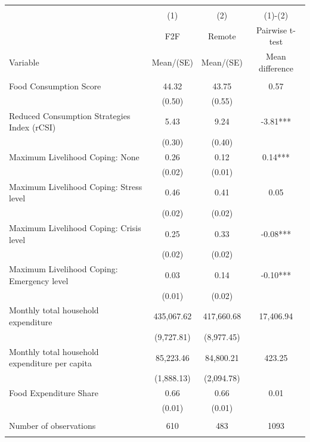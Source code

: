 
\begin{tabular}{@{\extracolsep{5pt}}lccc}
\\[-1.8ex]\hline \hline \\[-1.8ex]
 & \multicolumn{1}{c}{(1)}  & \multicolumn{1}{c}{(2)}  & \multicolumn{1}{c}{(1)-(2)} \\
 & \multicolumn{1}{c}{F2F}  & \multicolumn{1}{c}{Remote}  & \multicolumn{1}{c}{Pairwise t-test}  \\
Variable & Mean/(SE) & Mean/(SE) & Mean difference \\ \hline \\[-1.8ex] 
Food Consumption Score   & 44.32    & 43.75    & 0.57   \\
 & (0.50)  & (0.55)  &  \\ [1ex]
Reduced Consumption Strategies Index (rCSI)   & 5.43    & 9.24    & -3.81***   \\
 & (0.30)  & (0.40)  &  \\ [1ex]
Maximum Livelihood Coping: None   & 0.26    & 0.12    & 0.14***   \\
 & (0.02)  & (0.01)  &  \\ [1ex]
Maximum Livelihood Coping: Stress level   & 0.46    & 0.41    & 0.05   \\
 & (0.02)  & (0.02)  &  \\ [1ex]
Maximum Livelihood Coping: Crisis level   & 0.25    & 0.33    & -0.08***   \\
 & (0.02)  & (0.02)  &  \\ [1ex]
Maximum Livelihood Coping: Emergency level   & 0.03    & 0.14    & -0.10***   \\
 & (0.01)  & (0.02)  &  \\ [1ex]
Monthly total household expenditure   & 435,067.62    & 417,660.68    & 17,406.94   \\
 & (9,727.81)  & (8,977.45)  &  \\ [1ex]
Monthly total household expenditure per capita   & 85,223.46    & 84,800.21    & 423.25   \\
 & (1,888.13)  & (2,094.78)  &  \\ [1ex]
Food Expenditure Share   & 0.66    & 0.66    & 0.01   \\
 & (0.01)  & (0.01)  &  \\ [1ex]
\hline \\[-1.8ex]
Number of observations  & 610   & 483  & 1093  \\
\hline \hline \\[-1.8ex]

\end{tabular}
